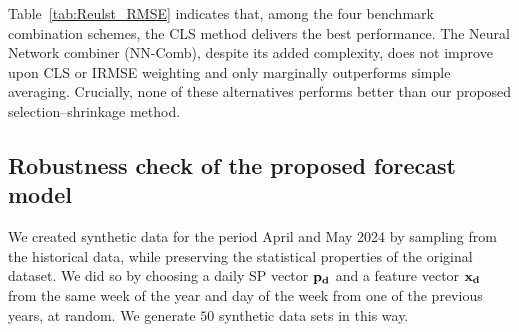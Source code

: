\documentclass{article}
\begin{document}
Table~\ref{tab:Reulst_RMSE} indicates that, among the four benchmark combination schemes, the CLS method delivers the best performance. The Neural Network combiner (NN-Comb), despite its added complexity, does not improve upon CLS or IRMSE weighting and only marginally outperforms simple averaging. Crucially, none of these alternatives performs better than our proposed selection–shrinkage method.


\subsection{Robustness check of the proposed forecast model}
\begin{table}
\centering
\caption{RMSE Results of Forecast Models on Synthetic Test Data.}
\label{tab:Reulst_Artificial_RMSE}
\end{table}
We created synthetic data for the period April and May 2024 by sampling from the historical data, while preserving the statistical properties of the original dataset. We did so by choosing a daily SP vector $\bf{p}_d$ and a feature vector $\bf{x}_d$ from the same week of the year and day of the week from one of the previous years, at random. We generate $50$ synthetic data sets in this way.
\end{document}
